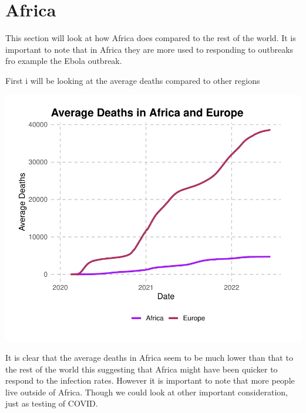 \documentclass[12pt,preprint, authoryear]{elsarticle}
\let\origfigure\figure
\let\endorigfigure\endfigure
\renewenvironment{figure}[1][2] {
    \expandafter\origfigure\expandafter[H]
} {
    \endorigfigure
}
\numberwithin{equation}{section}
\numberwithin{figure}{section}
\numberwithin{table}{section}
\begin{document}
\hypertarget{africa}{%
\section{Africa}\label{africa}}

This section will look at how Africa does compared to the rest of the
world. It is important to note that in Africa they are more used to
responding to outbreaks fro example the Ebola outbreak.

First i will be looking at the average deaths compared to other regions

\begin{Shaded}
\begin{Highlighting}[]
\end{Highlighting}
\end{Shaded}

\begin{figure}

{\centering \includegraphics{Q1_files/figure-latex/Figure1-1} 

}

\caption{Average deaths \label{Figure1}}\label{fig:Figure1}
\end{figure}

It is clear that the average deaths in Africa seem to be much lower than
that to the rest of the world this suggesting that Africa might have
been quicker to respond to the infection rates. However it is important
to note that more people live outside of Africa. Though we could look at
other important consideration, just as testing of COVID.
\end{document}
